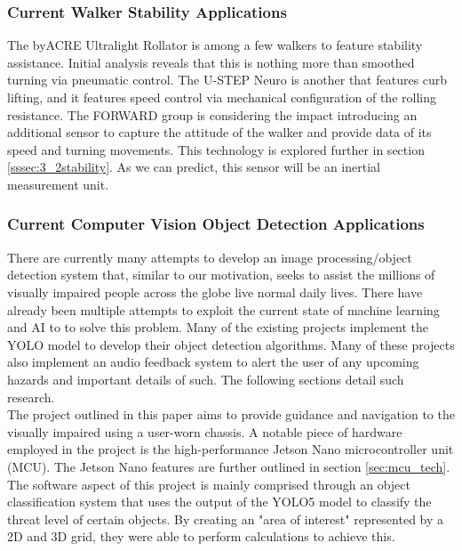 \subsubsection{Current Walker Stability Applications}
\noindent The byACRE Ultralight Rollator \cite{byACRE} is among a few walkers to feature stability assistance. Initial analysis reveals that this is nothing more than smoothed turning via pneumatic control. The U-STEP Neuro \cite{ustep} is another that features curb lifting, and it features speed control via mechanical configuration of the rolling resistance. The FORWARD group is considering the impact introducing an additional sensor to capture the attitude of the walker and provide data of its speed and turning movements. This technology is explored further in section \ref{sssec:3_2stability}. As we can predict, this sensor will be an inertial measurement unit.\\

\subsubsection{Current Computer Vision Object Detection Applications}

\noindent There are currently many attempts to develop an image processing/object detection system that, similar to our motivation, seeks to assist the millions of visually impaired people across the globe live normal daily lives. There have already been multiple attempts to exploit the current state of machine learning and AI to to solve this problem. Many of the existing projects implement the YOLO model to develop their object detection algorithms. Many of these projects also implement an audio feedback system to alert the user of any upcoming hazards and important details of such. The following sections detail such research. \\
    
\noindent The project outlined in this paper \cite{CVRef1} aims to provide guidance and navigation to the visually impaired using a user-worn chassis. A notable piece of hardware employed in the project is the high-performance Jetson Nano microcontroller unit (MCU). The Jetson Nano features are further outlined in section \ref{sec:mcu_tech}. \\

\noindent The software aspect of this project is mainly comprised through an object classification system that uses the output of the YOLO5 model to classify the threat level of certain objects. By creating an "area of interest" represented by a 2D and 3D grid, they were able to perform calculations to achieve this. \\

